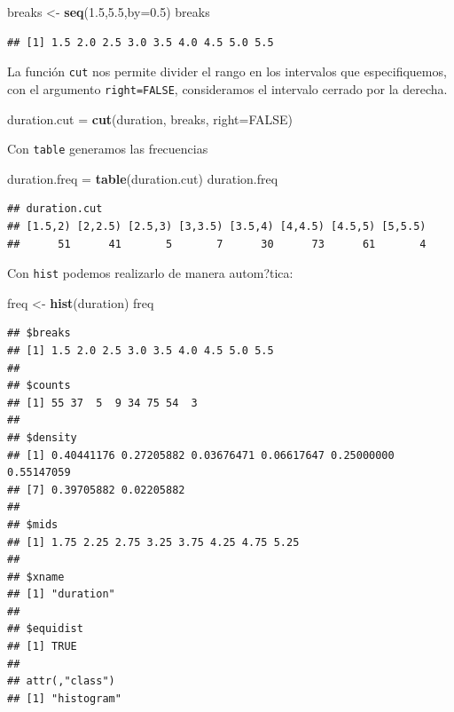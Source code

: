 \documentclass[]{book}
\newenvironment{Shaded}{\begin{snugshade}}{\end{snugshade}}
\newcommand{\KeywordTok}[1]{\textcolor[rgb]{0.13,0.29,0.53}{\textbf{#1}}}
\newcommand{\DataTypeTok}[1]{\textcolor[rgb]{0.13,0.29,0.53}{#1}}
\newcommand{\FloatTok}[1]{\textcolor[rgb]{0.00,0.00,0.81}{#1}}
\newcommand{\StringTok}[1]{\textcolor[rgb]{0.31,0.60,0.02}{#1}}
\newcommand{\OtherTok}[1]{\textcolor[rgb]{0.56,0.35,0.01}{#1}}
\newcommand{\NormalTok}[1]{#1}
\begin{document}
\begin{Shaded}
\begin{Highlighting}[]
\NormalTok{breaks <-}\StringTok{ }\KeywordTok{seq}\NormalTok{(}\FloatTok{1.5}\NormalTok{,}\FloatTok{5.5}\NormalTok{,}\DataTypeTok{by=}\FloatTok{0.5}\NormalTok{)}
\NormalTok{breaks}
\end{Highlighting}
\end{Shaded}

\begin{verbatim}
## [1] 1.5 2.0 2.5 3.0 3.5 4.0 4.5 5.0 5.5
\end{verbatim}

La función \texttt{cut} nos permite divider el rango en los intervalos
que especifiquemos, con el argumento \texttt{right=FALSE}, consideramos
el intervalo cerrado por la derecha.

\begin{Shaded}
\begin{Highlighting}[]
\NormalTok{duration.cut =}\StringTok{ }\KeywordTok{cut}\NormalTok{(duration, breaks, }\DataTypeTok{right=}\OtherTok{FALSE}\NormalTok{) }
\end{Highlighting}
\end{Shaded}

Con \texttt{table} generamos las frecuencias

\begin{Shaded}
\begin{Highlighting}[]
\NormalTok{duration.freq =}\StringTok{ }\KeywordTok{table}\NormalTok{(duration.cut) }
\NormalTok{duration.freq}
\end{Highlighting}
\end{Shaded}

\begin{verbatim}
## duration.cut
## [1.5,2) [2,2.5) [2.5,3) [3,3.5) [3.5,4) [4,4.5) [4.5,5) [5,5.5) 
##      51      41       5       7      30      73      61       4
\end{verbatim}

Con \texttt{hist} podemos realizarlo de manera autom?tica:

\begin{Shaded}
\begin{Highlighting}[]
\NormalTok{freq <-}\StringTok{ }\KeywordTok{hist}\NormalTok{(duration)}
\NormalTok{freq}
\end{Highlighting}
\end{Shaded}

\begin{verbatim}
## $breaks
## [1] 1.5 2.0 2.5 3.0 3.5 4.0 4.5 5.0 5.5
## 
## $counts
## [1] 55 37  5  9 34 75 54  3
## 
## $density
## [1] 0.40441176 0.27205882 0.03676471 0.06617647 0.25000000 0.55147059
## [7] 0.39705882 0.02205882
## 
## $mids
## [1] 1.75 2.25 2.75 3.25 3.75 4.25 4.75 5.25
## 
## $xname
## [1] "duration"
## 
## $equidist
## [1] TRUE
## 
## attr(,"class")
## [1] "histogram"
\end{verbatim}
\end{document}
